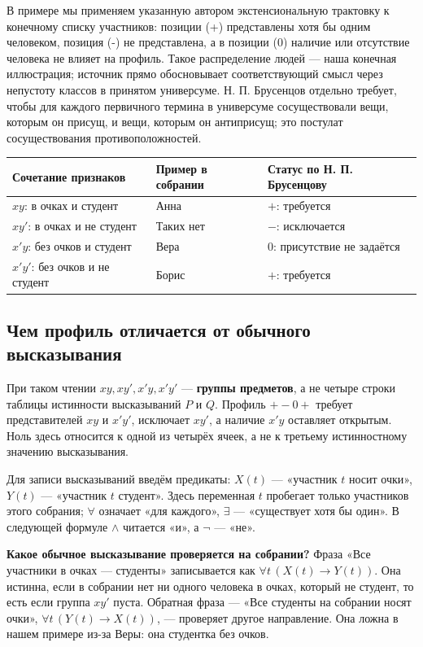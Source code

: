 \documentclass[12pt,a4paper]{article}
\begin{document}
В примере мы применяем указанную автором экстенсиональную трактовку к конечному списку участников: позиции (+) представлены хотя бы одним человеком, позиция (-) не представлена, а в позиции (0) наличие или отсутствие человека не влияет на профиль. Такое распределение людей — наша конечная иллюстрация; источник прямо обосновывает соответствующий смысл через непустоту классов в принятом универсуме. Н. П. Брусенцов отдельно требует, чтобы для каждого первичного термина в универсуме сосуществовали вещи, которым он присущ, и вещи, которым он антиприсущ; это постулат сосуществования противоположностей.

\begin{longtable}{P{.18\linewidth}P{.43\linewidth}P{.27\linewidth}}
\toprule
\textbf{Сочетание признаков} & \textbf{Пример в собрании} & \textbf{Статус по Н. П. Брусенцову} \\
\midrule
\(xy\): в очках и студент & Анна & \(+\): требуется \\
\(xy'\): в очках и не студент & Таких нет & \(-\): исключается \\
\(x'y\): без очков и студент & Вера & \(0\): присутствие не задаётся \\
\(x'y'\): без очков и не студент & Борис & \(+\): требуется \\
\bottomrule
\end{longtable}

\subsection{Чем профиль отличается от обычного высказывания}

При таком чтении \(xy, xy', x'y, x'y'\) — \textbf{группы предметов}, а не четыре строки таблицы истинности высказываний \(P\) и \(Q\). Профиль \(+-0+\) требует представителей \(xy\) и \(x'y'\), исключает \(xy'\), а наличие \(x'y\) оставляет открытым. Ноль здесь относится к одной из четырёх ячеек, а не к третьему истинностному значению высказывания.

Для записи высказываний введём предикаты: \(X(t)\) — «участник \(t\) носит очки», \(Y(t)\) — «участник \(t\) студент». Здесь переменная \(t\) пробегает только участников этого собрания; \(\forall\) означает «для каждого», \(\exists\) — «существует хотя бы один». В следующей формуле \(\land\) читается «и», а \(\neg\) — «не».

\textbf{Какое обычное высказывание проверяется на собрании?} Фраза «Все участники в очках — студенты» записывается как \(\forall t\,(X(t)\to Y(t))\). Она истинна, если в собрании нет ни одного человека в очках, который не студент, то есть если группа \(xy'\) пуста. Обратная фраза — «Все студенты на собрании носят очки», \(\forall t\,(Y(t)\to X(t))\), — проверяет другое направление. Она ложна в нашем примере из-за Веры: она студентка без очков.
\end{document}
